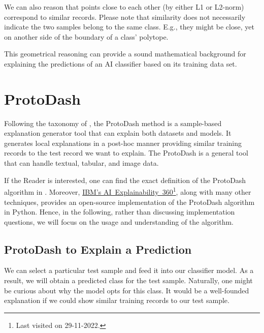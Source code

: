 \documentclass[output=paper,colorlinks,citecolor=brown
]{langscibook}
\begin{document}
We can also reason that points close to each other (by either L1 or L2-norm) correspond to similar records. Please note that similarity does not necessarily indicate the two samples belong to the same class. E.g., they might be close, yet on another side of the boundary of a class' polytope.

This geometrical reasoning can provide a sound mathematical background for explaining the predictions of an AI classifier based on its training data set. 

\section{ProtoDash}
\label{sec:protodash}
Following the taxonomy of \cite{aix360}, the ProtoDash \cite{protodash} method is a sample-based explanation generator tool that can explain both datasets and models. It generates local explanations in a post-hoc manner providing similar training records to the test record we want to explain. The ProtoDash is a general tool that can handle textual, tabular, and image data.

If the Reader is interested, one can find the exact definition of the ProtoDash algorithm in \cite{protodash}. Moreover, \href{https://aix360.mybluemix.net/}{IBM's AI~Explainability~360}\footnote{Last visited on 29-11-2022.}, along with many other techniques, provides an open-source implementation of the ProtoDash algorithm in Python. Hence, in the following, rather than discussing implementation questions, we will focus on the usage and understanding of the algorithm.

\subsection{ProtoDash to Explain a Prediction}
We can select a particular test sample and feed it into our classifier model. As a result, we will obtain a predicted class for the test sample. Naturally, one might be curious about why the model opts for this class. It would be a well-founded explanation if we could show similar training records to our test sample.
\end{document}
